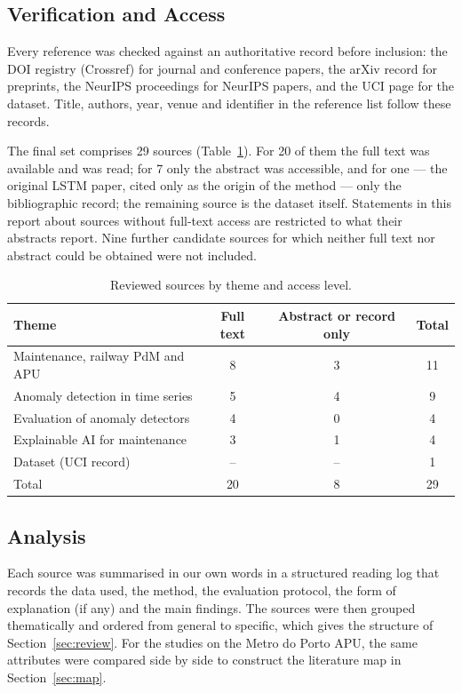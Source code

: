 \documentclass[12pt,a4paper]{article}
\begin{document}
\subsection{Verification and Access}
Every reference was checked against an authoritative record before inclusion: the DOI registry (Crossref) for journal and conference papers, the arXiv record for preprints, the NeurIPS proceedings for NeurIPS papers, and the UCI page for the dataset. Title, authors, year, venue and identifier in the reference list follow these records.

The final set comprises 29 sources (Table~\ref{tab:sources}). For 20 of them the full text was available and was read; for 7 only the abstract was accessible, and for one --- the original LSTM paper, cited only as the origin of the method --- only the bibliographic record; the remaining source is the dataset itself. Statements in this report about sources without full-text access are restricted to what their abstracts report. Nine further candidate sources for which neither full text nor abstract could be obtained were not included.

\begin{table}[h]
\centering
\caption{Reviewed sources by theme and access level.}
\label{tab:sources}
\begin{tabular}{lccc}
\toprule
Theme & Full text & Abstract or record only & Total \\
\midrule
Maintenance, railway PdM and APU & 8 & 3 & 11 \\
Anomaly detection in time series & 5 & 4 & 9 \\
Evaluation of anomaly detectors & 4 & 0 & 4 \\
Explainable AI for maintenance & 3 & 1 & 4 \\
Dataset (UCI record) & -- & -- & 1 \\
\midrule
Total & 20 & 8 & 29 \\
\bottomrule
\end{tabular}
\end{table}

\subsection{Analysis}
Each source was summarised in our own words in a structured reading log that records the data used, the method, the evaluation protocol, the form of explanation (if any) and the main findings. The sources were then grouped thematically and ordered from general to specific, which gives the structure of Section~\ref{sec:review}. For the studies on the Metro do Porto APU, the same attributes were compared side by side to construct the literature map in Section~\ref{sec:map}.
\end{document}
